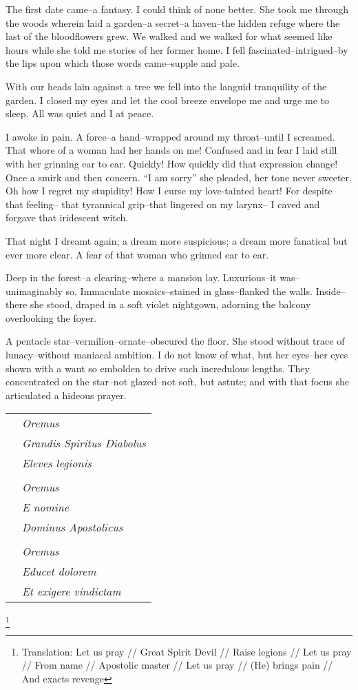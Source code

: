 \documentclass{article}
\begin{document}
\noindent %
The first date came--a fantasy.
I could think of none better. %
She took me through the woods wherein laid a garden--a
secret--a haven--the hidden refuge where
the last of the bloodflowers grew.
We walked and we walked for what seemed like hours
while she told me stories of her former home.
I fell fascinated--intrigued--by the lips
upon which those words came--supple and pale.


With our heads lain against a tree we
fell into the languid tranquility of the garden.
I closed my eyes and let the cool breeze envelope me
and urge me to sleep. All was quiet and I at peace.


I awoke in pain.
A force--a hand--wrapped around my throat--until I screamed.
That whore of a woman had her hands on me!
Confused and in fear I laid still
with her grinning ear to ear.
Quickly! How quickly did that expression change!
Once a smirk and then concern.
``I am sorry'' she pleaded, her tone never sweeter.
Oh how I regret my stupidity!
How I curse my love-tainted heart!
For despite that feeling--
that tyrannical grip--that lingered on my larynx--
I caved and forgave that iridescent witch.


That night I dreamt again; a dream more suspicious;
a dream more fanatical but ever more clear.
A fear of that woman who grinned ear to ear. %
\vvvv


\noindent
Deep in the forest--a clearing--where a mansion lay.
Luxurious--it was--unimaginably so.
Immaculate mosaics--stained in glass--flanked the walls.
Inside--there she stood, draped in a soft violet nightgown,
adorning the balcony overlooking the foyer.


A pentacle star--vermilion--ornate--obscured the floor.
She stood without trace of lunacy--without
maniacal ambition.
I do not know of what, but her eyes--her eyes
shown with a want so embolden to drive
such incredulous lengths.
They concentrated on the star--not
glazed--not soft, but astute; and with
that focus she articulated a hideous prayer.
\VV


\singlespace
\begin{tabular}{ll}
& \textit{Oremus} \\
& \textit{Grandis Spiritus Diabolus} \\
& \textit{Eleves legionis} \\
& \\
& \textit{Oremus} \\
& \textit{E nomine} \\
& \textit{Dominus Apostolicus} \\
& \\
& \textit{Oremus} \\
& \textit{Educet dolorem} \\
& \textit{Et exigere vindictam} \\
\end{tabular}\revertspace\footnote{
Translation:
Let us pray // Great Spirit Devil // Raise legions //
Let us pray // From name // Apostolic master //
Let us pray // (He) brings pain // And exacts revenge
} \vspace*{3ex}
\end{document}
